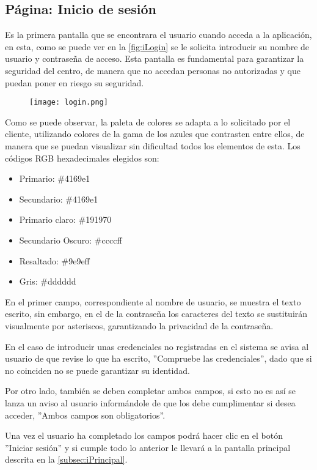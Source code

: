 \subsection{Página: Inicio de sesión}\label{subsec:iLogin}
Es la primera pantalla que se encontrara el usuario cuando acceda a la aplicación, en esta, como se puede ver en la \autoref{fig:iLogin} se le solicita introducir su nombre de usuario y contraseña de acceso. Esta pantalla es fundamental para garantizar la seguridad del centro, de manera que no accedan personas no autorizadas y que puedan poner en riesgo su seguridad.
\begin{figure}[H]
	{\texttt{[image: login.png]}}
\end{figure}
Como se puede observar, la paleta de colores se adapta a lo solicitado por el cliente, utilizando colores de la gama de los azules que contrasten entre ellos, de manera que se puedan visualizar sin dificultad todos los elementos de esta. Los códigos RGB hexadecimales elegidos son:
\begin{itemize}
	\item Primario: \#4169e1
	\item Secundario: \#4169e1
	\item Primario claro: \#191970
	\item Secundario Oscuro: \#ccccff
	\item Resaltado: \#9e9eff
	\item Gris: \#dddddd
\end{itemize}
En el primer campo, correspondiente al nombre de usuario, se muestra el texto escrito, sin embargo, en el de la contraseña los caracteres del texto se sustituirán visualmente por asteriscos, garantizando la privacidad de la contraseña.

En el caso de introducir unas credenciales no registradas en el sistema se avisa al usuario de que revise lo que ha escrito, ''Compruebe las credenciales'', dado que si no coinciden no se puede garantizar su identidad.

Por otro lado, también se deben completar ambos campos, si esto no es así se lanza un aviso al usuario informándole de que los debe cumplimentar si desea acceder, ''Ambos campos son obligatorios''.

Una vez el usuario ha completado los campos podrá hacer clic en el botón ''Iniciar sesión'' y si cumple todo lo anterior le llevará a la pantalla principal descrita en la \autoref{subsec:iPrincipal}.


